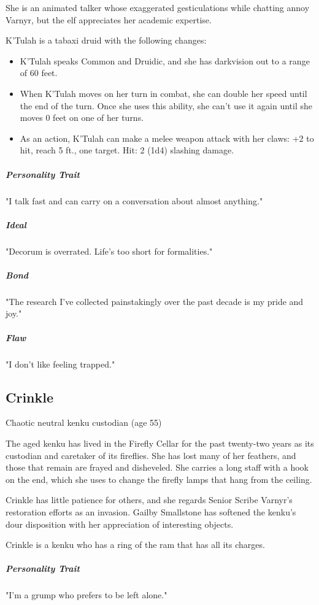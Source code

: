 \documentclass[10pt,a4paper,twoside,bg=print,twocolumn,openany,nodeprecatedcode]{dndbook}
\begin{document}
She is an animated talker whose exaggerated gesticulations while chatting annoy Varnyr, but the elf appreciates her academic expertise.

K'Tulah is a tabaxi druid with the following changes:


\begin{itemize}
\item K'Tulah speaks Common and Druidic, and she has darkvision out to a range of 60 feet.
\item When K'Tulah moves on her turn in combat, she can double her speed until the end of the turn. Once she uses this ability, she can't use it again until she moves 0 feet on one of her turns.
\item As an action, K'Tulah can make a melee weapon attack with her claws: +2 to hit, reach 5 ft., one target. Hit: 2 (1d4) slashing damage.
\end{itemize}

\subparagraph{Personality Trait}
"I talk fast and can carry on a conversation about almost anything."

\subparagraph{Ideal}
"Decorum is overrated. Life's too short for formalities."

\subparagraph{Bond}
"The research I've collected painstakingly over the past decade is my pride and joy."

\subparagraph{Flaw}
"I don't like feeling trapped."

\subsection{Crinkle}
Chaotic neutral kenku custodian (age 55)

The aged kenku has lived in the Firefly Cellar for the past twenty-two years as its custodian and caretaker of its fireflies. She has lost many of her feathers, and those that remain are frayed and disheveled. She carries a long staff with a hook on the end, which she uses to change the firefly lamps that hang from the ceiling.

Crinkle has little patience for others, and she regards Senior Scribe Varnyr's restoration efforts as an invasion. Gailby Smallstone has softened the kenku's dour disposition with her appreciation of interesting objects.

Crinkle is a kenku who has a ring of the ram that has all its charges.

\subparagraph{Personality Trait}
"I'm a grump who prefers to be left alone."
\end{document}
